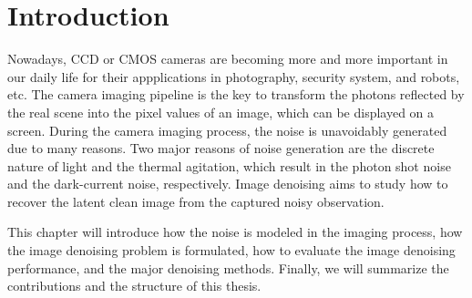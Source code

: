%

\chapter{Introduction}
\label{sec:intro}

Nowadays, CCD or CMOS cameras are becoming more and more important in our daily life for their appplications in photography, security system, and robots, etc. The camera imaging pipeline is the key to transform the photons reflected by the real scene into the pixel values of an image, which can be displayed on a screen. During the camera imaging process, the noise is unavoidably generated due to many reasons. Two major reasons of noise generation are the discrete nature of light and the thermal agitation, which result in the photon shot noise and the dark-current noise, respectively. Image denoising aims to study how to recover the latent clean image from the captured noisy observation. 

This chapter will introduce how the noise is modeled in the imaging process, how the image denoising problem is formulated, how to evaluate the image denoising performance, and the major denoising methods. Finally, we will summarize the contributions and the structure of this thesis.



